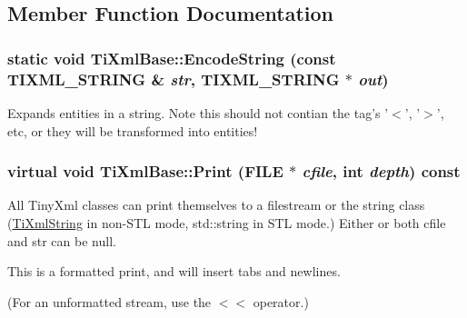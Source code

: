 \subsection{Member Function Documentation}
\hypertarget{class_ti_xml_base_a6bd8c315c1acb09e34107b8736505948}{
\subsubsection[{EncodeString}]{\setlength{\rightskip}{0pt plus 5cm}static void TiXmlBase::EncodeString (const TIXML\_\-STRING \& {\em str}, \/  TIXML\_\-STRING $\ast$ {\em out})}}
\label{class_ti_xml_base_a6bd8c315c1acb09e34107b8736505948}
Expands entities in a string. Note this should not contian the tag's '$<$', '$>$', etc, or they will be transformed into entities! \hypertarget{class_ti_xml_base_a0de56b3f2ef14c65091a3b916437b512}{
\subsubsection[{Print}]{\setlength{\rightskip}{0pt plus 5cm}virtual void TiXmlBase::Print (FILE $\ast$ {\em cfile}, \/  int {\em depth}) const}}
\label{class_ti_xml_base_a0de56b3f2ef14c65091a3b916437b512}
All TinyXml classes can print themselves to a filestream or the string class (\hyperlink{class_ti_xml_string}{TiXmlString} in non-\/STL mode, std::string in STL mode.) Either or both cfile and str can be null.

This is a formatted print, and will insert tabs and newlines.

(For an unformatted stream, use the $<$$<$ operator.) 

